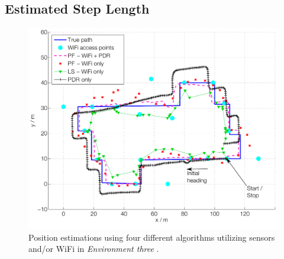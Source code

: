 \documentclass{LTHthesis}
\begin{document}
\subsection{Estimated Step Length}
%
\begin{figure}[!hbt]

\includegraphics[width=1\textwidth ]{images/sensor_fused/path_multi}
\caption{Position estimations using four different algorithms utilizing sensors and/or WiFi in \emph{Environment three} .}\label{path_multi}
\end{figure}
%
\end{document}
